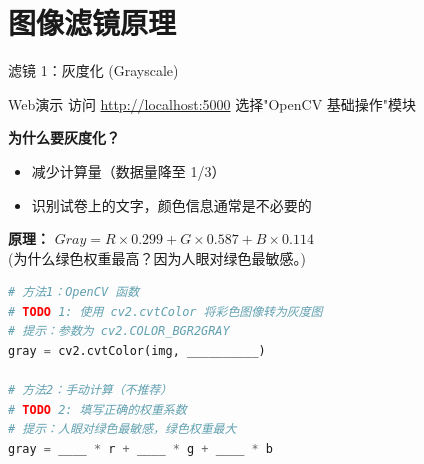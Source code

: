 

\section{图像滤镜原理}

\begin{frame}[fragile]{滤镜 1：灰度化 (Grayscale)}
	\begin{alertblock}{Web演示}
		访问 \url{http://localhost:5000} 选择"OpenCV 基础操作"模块
	\end{alertblock}

	\textbf{为什么要灰度化？}
	\begin{itemize}
		\item 减少计算量（数据量降至 1/3）
		\item 识别试卷上的文字，颜色信息通常是不必要的
	\end{itemize}
	\textbf{原理：} $Gray = R \times 0.299 + G \times 0.587 + B \times 0.114$
	\\ (为什么绿色权重最高？因为人眼对绿色最敏感。)

	\begin{lstlisting}[language=Python, basicstyle=\ttfamily\small]
# 方法1：OpenCV 函数
# TODO 1: 使用 cv2.cvtColor 将彩色图像转为灰度图
# 提示：参数为 cv2.COLOR_BGR2GRAY
gray = cv2.cvtColor(img, __________)

# 方法2：手动计算（不推荐）
# TODO 2: 填写正确的权重系数
# 提示：人眼对绿色最敏感，绿色权重最大
gray = ____ * r + ____ * g + ____ * b
\end{lstlisting}
\end{frame}

